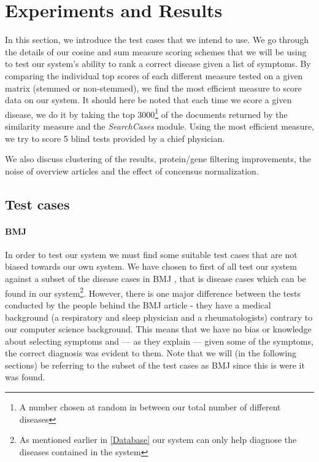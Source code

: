 \chapter{Experiments and Results\label{ExperimentsResults}}

In this section, we introduce the test cases that we intend to use. We
go through the details of our cosine and sum measure scoring schemes
that we will be using to test our system's ability to rank a correct
disease given a list of symptoms. By comparing the individual top
scores of each different measure tested on a given matrix (stemmed or
non-stemmed), we find the most efficient measure to score data on our
system. It should here be noted that each time we score a given
disease, we do it by taking the top 3000\footnote{A number chosen at
  random in between our total number of different diseases} of the
documents returned by the similarity measure and the
\textit{SearchCases} module. Using the most efficient measure, we try
to score 5 blind tests provided by a chief physician. 

We also discuss clustering of the results, protein/gene filtering 
improvements, the noise of overview articles and the effect of 
concensus normalization.

\section{Test cases}

\subsubsection{BMJ}
In order to test our system we must find some suitable test cases
that are not biased towards our own system. We have chosen to first of
all test our system against a subset of the disease cases in BMJ
\cite{HangwiTang11102006}, that is disease cases which can be found in
our system\footnote{As mentioned earlier in \ref{Database} our system
  can only help diagnose the diseases contained in the
  system}. However, there is one major difference between the tests
conducted by the people behind the BMJ article - they have a medical
background (a respiratory and sleep physician and a rheumatologists)
contrary to our computer science background. This means that we have
no bias or knowledge about selecting symptoms and --- as they explain ---
given some of the symptoms, the correct diagnosis was evident to
them. Note that we will (in the following sections) be referring to
the subset of the test cases as BMJ since this is were it was
found.

